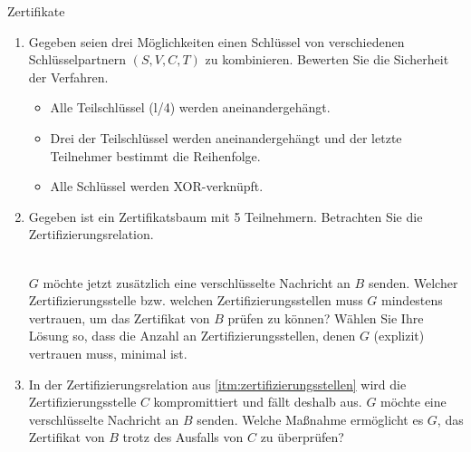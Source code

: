 \documentclass{article}
\begin{document}
\begin{exercise}{Zertifikate}
  \begin{enumerate}
    \item Gegeben seien drei Möglichkeiten einen Schlüssel von verschiedenen Schlüsselpartnern $(S,V,C,T)$ zu kombinieren. Bewerten Sie die Sicherheit der Verfahren.
      \begin{itemize}
        \item Alle Teilschlüssel (l/4) werden aneinandergehängt.
        \item Drei der Teilschlüssel werden aneinandergehängt und der letzte Teilnehmer bestimmt die Reihenfolge.
        \item Alle Schlüssel werden XOR-verknüpft.
      \end{itemize}
    \item\label{itm:zertifizierungsstellen} Gegeben ist ein Zertifikatsbaum mit 5 Teilnehmern. Betrachten Sie die Zertifizierungsrelation.\\
      \\
      $G$ möchte jetzt zusätzlich eine verschlüsselte Nachricht an $B$ senden. Welcher Zertifizierungsstelle bzw. welchen Zertifizierungsstellen muss $G$ mindestens vertrauen, um das Zertifikat von $B$ prüfen zu können? Wählen Sie Ihre Lösung so, dass die Anzahl an Zertifizierungsstellen, denen $G$ (explizit) vertrauen muss, minimal ist.
    \item In der Zertifizierungsrelation aus \ref{itm:zertifizierungsstellen} wird die Zertifizierungsstelle $C$ kompromittiert und fällt deshalb aus. $G$ möchte eine verschlüsselte Nachricht an $B$ senden. Welche Maßnahme ermöglicht es $G$, das Zertifikat von $B$ trotz des Ausfalls von $C$ zu überprüfen?
  \end{enumerate}


\end{exercise}
\end{document}
